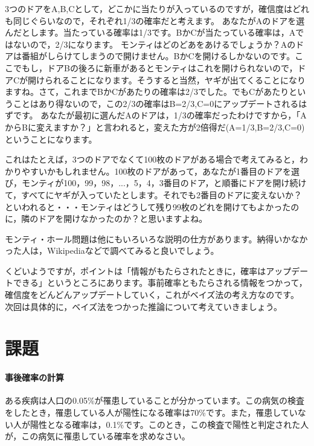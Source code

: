 \documentclass{ltjsbook}
\begin{document}
3つのドアをA,B,Cとして，どこかに当たりが入っているのですが，確信度はどれも同じぐらいなので，それぞれ1/3の確率だと考えます。
あなたがAのドアを選んだとします。当たっている確率は1/3です。BかCが当たっている確率は，Aではないので，2/3になります。
モンティはどのどあをあけるでしょうか？Aのドアは番組がしらけてしまうので開けません。BかCを開けるしかないのです。ここでもし，ドアBの後ろに新車があるとモンティはこれを開けられないので，ドアCが開けられることになります。そうすると当然，ヤギが出てくることになりますね。さて，これまでBかCがあたりの確率は2/3でした。でもCがあたりということはあり得ないので，この2/3の確率はB=2/3,C=0にアップデートされるはずです。
あなたが最初に選んだAのドアは，1/3の確率だったわけですから，「AからBに変えますか？」と言われると，変えた方が2倍得だ(A=1/3,B=2/3,C=0)ということになります。

これはたとえば，3つのドアでなくて100枚のドアがある場合で考えてみると，わかりやすいかもしれません。100枚のドアがあって，あなたが1番目のドアを選び，モンティが100，99，98，...，5，4，3番目のドア，と順番にドアを開け続けて，すべてにヤギが入っていたとします。それでも2番目のドアに変えないか？といわれると・・・モンティはどうして残り99枚のどれを開けてもよかったのに，隣のドアを開けなかったのか？と思いますよね。

モンティ・ホール問題は他にもいろいろな説明の仕方があります。納得いかなかった人は，Wikipediaなどで調べてみると良いでしょう。

くどいようですが，ポイントは「情報がもたらされたときに，確率はアップデートできる」というところにあります。事前確率ともたらされる情報をつかって，確信度をどんどんアップデートしていく，これがベイズ法の考え方なのです。
次回は具体的に，ベイズ法をつかった推論について考えていきましょう。

\section{課題}
\paragraph{事後確率の計算}ある疾病は人口の0.05\%が罹患していることが分かっています。この病気の検査をしたとき，罹患している人が陽性になる確率は70\%です。また，罹患していない人が陽性となる確率は，0.1\%です。このとき，この検査で陽性と判定された人が，この病気に罹患している確率を求めなさい。
\end{document}
